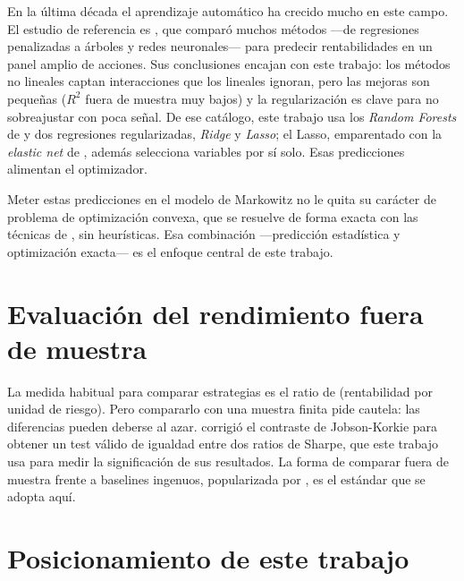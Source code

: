 En la última década el aprendizaje automático ha crecido mucho en este campo. El
estudio de referencia es \citet{Gu2020}, que comparó muchos métodos ---de
regresiones penalizadas a árboles y redes neuronales--- para predecir
rentabilidades en un panel amplio de acciones. Sus conclusiones encajan con este
trabajo: los métodos no lineales captan interacciones que los lineales ignoran,
pero las mejoras son pequeñas ($R^2$ fuera de muestra muy bajos) y la
regularización es clave para no sobreajustar con poca señal. De ese catálogo,
este trabajo usa los \textit{Random Forests} de \citet{Breiman2001} y dos
regresiones regularizadas, \textit{Ridge} y \textit{Lasso}; el Lasso, emparentado
con la \textit{elastic net} de \citet{Zou2005}, además selecciona variables por
sí solo. Esas predicciones alimentan el optimizador.

Meter estas predicciones en el modelo de Markowitz no le quita su carácter de
problema de optimización convexa, que se resuelve de forma exacta con las
técnicas de \citet{Boyd2004}, sin heurísticas. Esa combinación ---predicción
estadística y optimización exacta--- es el enfoque central de este trabajo.

\section{Evaluación del rendimiento fuera de muestra}

La medida habitual para comparar estrategias es el ratio de \citet{Sharpe1966}
(rentabilidad por unidad de riesgo). Pero compararlo con una muestra finita pide
cautela: las diferencias pueden deberse al azar. \citet{Memmel2003} corrigió el
contraste de Jobson-Korkie para obtener un test válido de igualdad entre dos
ratios de Sharpe, que este trabajo usa para medir la significación de sus
resultados. La forma de comparar fuera de muestra frente a baselines ingenuos,
popularizada por \citet{DeMiguel2009}, es el estándar que se adopta aquí.


\section{Posicionamiento de este trabajo}


